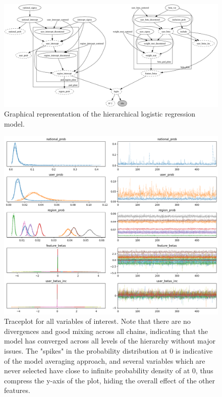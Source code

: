 \documentclass[12pt]{article}
\begin{document}
    \begin{figure}[h]
        \centering
        \includegraphics[width=\textwidth]{images/model_graph.png}
        \caption{Graphical representation of the hierarchical logistic regression model.}
        \label{fig:model_graph}
    \end{figure}


\begin{figure}[h]
    \centering
    \includegraphics[width=\textwidth]{images/traceplot.png}
    \caption{Traceplot for all variables of interest. Note that there are no divergences and good mixing across all
        chains, indicating that the model has converged across all levels of the hierarchy without major issues. 
        The "spikes" in the probability distribution at 0 is indicative of the model averaging approach, and several 
        variables which are never selected have close to infinite probability density of at 0, thus compress the y-axis
        of the plot, hiding the overall effect of the other features.}
    \label{fig:traceplot}
\end{figure}
\end{document}
